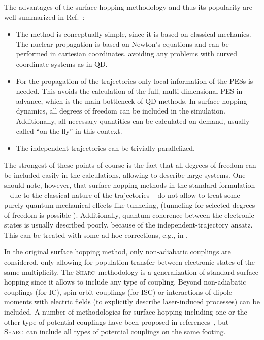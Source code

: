 \documentclass[a4paper,11pt,DIV=15,openany,twoside=false]{scrbook}
\newcommand{\sharc}{\textsc{Sharc}}
\begin{document}
The advantages of the surface hopping methodology and thus its popularity are well summarized in Ref.~\cite{Barbatti2011WCMS}:
\begin{itemize}
  \item The method is conceptually simple, since it is based on classical mechanics. The nuclear propagation is based on Newton's equations and can be performed in cartesian coordinates, avoiding any problems with curved coordinate systems as in QD.
  \item For the propagation of the trajectories only local information of the PESs is needed. This avoids the calculation of the full, multi-dimensional PES in advance, which is the main bottleneck of QD methods. In surface hopping dynamics, all degrees of freedom can be included in the simulation. Additionally, all necessary quantities can be calculated on-demand, usually called ``on-the-fly'' in this context.
  \item The independent trajectories can be trivially parallelized.
\end{itemize}
The strongest of these points of course is the fact that all degrees of freedom can be included easily in the calculations, allowing to describe large systems.
One should note, however, that surface hopping methods in the standard formulation~\cite{Tully1971JCP, Tully1990JCP} -- due to  the classical nature of the trajectories -- do not allow to treat some purely quantum-mechanical effects like tunneling, (tunneling for selected degrees of freedom is possible \cite{Hammes-Schiffer1994JCP}). Additionally, quantum coherence between the electronic states is usually described poorly, because of the independent-trajectory ansatz. This can be treated with some ad-hoc corrections, e.g., in \cite{Granucci2007JCP}.

In the original surface hopping method, only non-adiabatic couplings are considered, only allowing for population transfer between electronic states of the same multiplicity. 
The \sharc\ methodology is a generalization of standard surface hopping since it allows to include any type of coupling. Beyond non-adiabatic couplings (for IC), spin-orbit couplings (for ISC) or interactions of dipole moments with electric fields (to explicitly describe laser-induced processes) can be included.
A number of methodologies for surface hopping including one or the other type of potential couplings 
have been proposed in references~\cite{Thachuk1996JCP,Maiti2004JPCA,Jones2008JPCA,Mitric2009PRA,Granucci2012JCP,Curchod2013C,Cui2014JCP}, but \sharc\ can include all types of potential couplings on the same footing. 
\end{document}
